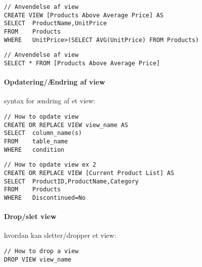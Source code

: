 \begin{lstlisting}[caption=Et andet kodeeksempel for anvendelse af View.,label=code:view]
// Anvendelse af view
CREATE VIEW [Products Above Average Price] AS
SELECT 	ProductName,UnitPrice
FROM 	Products
WHERE 	UnitPrice>(SELECT AVG(UnitPrice) FROM Products)
\end{lstlisting}

\begin{lstlisting}[caption=Kodeeksempel for anvendelse af View.,label=code:view]
// Anvendelse af view
SELECT * FROM [Products Above Average Price]
\end{lstlisting}

\paragraph{Opdatering/Ændring af view} syntax for ændring af et view:

\begin{lstlisting}[caption=Opdatering af view.]
// How to opdate view
CREATE OR REPLACE VIEW view_name AS
SELECT 	column_name(s)
FROM 	table_name
WHERE 	condition
\end{lstlisting}

\begin{lstlisting}[caption=Andet eksempel på opdatering af et view.]
// How to opdate view ex 2
CREATE OR REPLACE VIEW [Current Product List] AS
SELECT 	ProductID,ProductName,Category
FROM 	Products
WHERE 	Discontinued=No
\end{lstlisting}

\paragraph{Drop/slet view} hvordan kan sletter/dropper et view: 

\begin{lstlisting}[caption=Dropping af view.]
// How to drop a view
DROP VIEW view_name
\end{lstlisting}